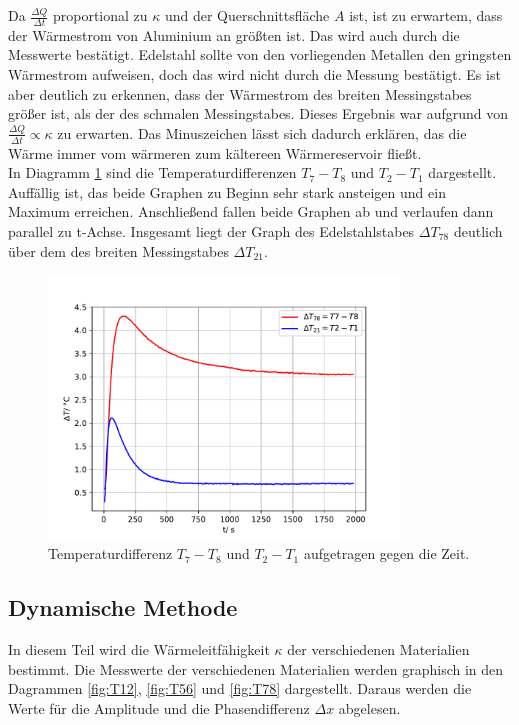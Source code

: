 Da $\frac{\Delta Q}{\Delta t}$ proportional zu $\kappa$ und der Querschnittsfläche $A$ ist,
ist zu erwartem, dass der Wärmestrom von Aluminium an größten ist. Das wird auch durch die Messwerte bestätigt.
Edelstahl sollte von den vorliegenden Metallen den gringsten Wärmestrom aufweisen, doch das wird
nicht durch die Messung  bestätigt. Es ist aber deutlich zu erkennen, dass der Wärmestrom des breiten
Messingstabes größer ist, als der des schmalen Messingstabes. Dieses Ergebnis war aufgrund von
$\frac{\Delta Q}{\Delta t} \propto \kappa$ zu erwarten.
Das Minuszeichen lässt sich dadurch erklären, das die Wärme immer vom wärmeren zum
kältereen Wärmereservoir fließt.
\\
In Diagramm \ref{fig:diff} sind die Temperaturdifferenzen $T_{7}-T_{8}$ und $T_{2}-T_{1}$
dargestellt. Auffällig ist, das beide Graphen zu Beginn sehr stark ansteigen und ein
Maximum erreichen. Anschließend fallen beide Graphen ab und verlaufen dann parallel zu t-Achse.
Insgesamt liegt der Graph des Edelstahlstabes $\Delta T_{78}$ deutlich über dem des breiten
Messingstabes $\Delta T_{21}$.
\begin{figure}[H]
  \centering
  \includegraphics[height=7cm]{T7821.pdf}
  \caption{Temperaturdifferenz $T_{7}-T_{8}$ und $T_{2}-T_{1}$ aufgetragen gegen die Zeit.}
  \label{fig:diff}
\end{figure}

\subsection{Dynamische Methode}
In diesem Teil wird die Wärmeleitfähigkeit $\kappa$ der verschiedenen Materialien bestimmt.
Die Messwerte der verschiedenen Materialien werden graphisch in
den Dagrammen \ref{fig:T12}, \ref{fig:T56} und \ref{fig:T78} dargestellt. Daraus
werden die Werte für die Amplitude und die Phasendifferenz $\Delta x$ abgelesen.


